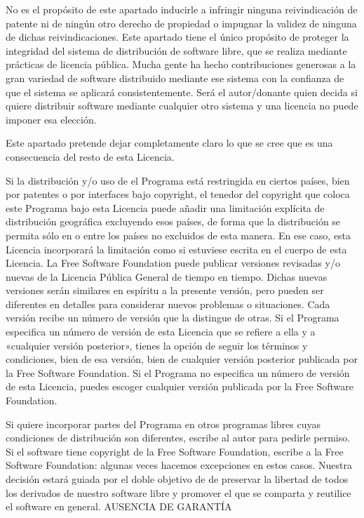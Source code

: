 No es el propósito de este apartado inducirle a infringir ninguna reivindicación de patente ni de ningún otro derecho de propiedad o impugnar la validez de ninguna de dichas reivindicaciones. Este apartado tiene el único propósito de proteger la integridad del sistema de distribución de software libre, que se realiza mediante prácticas de licencia pública. Mucha gente ha hecho contribuciones generosas a la gran variedad de software distribuido mediante ese sistema con la confianza de que el sistema se aplicará consistentemente. Será el autor/donante quien decida si quiere distribuir software mediante cualquier otro sistema y una licencia no puede imponer esa elección.

Este apartado pretende dejar completamente claro lo que se cree que es una consecuencia del resto de esta Licencia.

Si la distribución y/o uso de el Programa está restringida en ciertos países, bien por patentes o por interfaces bajo copyright, el tenedor del copyright que coloca este Programa bajo esta Licencia puede añadir una limitación explícita de distribución geográfica excluyendo esos países, de forma que la distribución se permita sólo en o entre los países no excluidos de esta manera. En ese caso, esta Licencia incorporará la limitación como si estuviese escrita en el cuerpo de esta Licencia.
La Free Software Foundation puede publicar versiones revisadas y/o nuevas de la Licencia Pública General de tiempo en tiempo. Dichas nuevas versiones serán similares en espíritu a la presente versión, pero pueden ser diferentes en detalles para considerar nuevos problemas o situaciones.
Cada versión recibe un número de versión que la distingue de otras. Si el Programa especifica un número de versión de esta Licencia que se refiere a ella y a «cualquier versión posterior», tienes la opción de seguir los términos y condiciones, bien de esa versión, bien de cualquier versión posterior publicada por la Free Software Foundation. Si el Programa no especifica un número de versión de esta Licencia, puedes escoger cualquier versión publicada por la Free Software Foundation.

Si quiere incorporar partes del Programa en otros programas libres cuyas condiciones de distribución son diferentes, escribe al autor para pedirle permiso. Si el software tiene copyright de la Free Software Foundation, escribe a la Free Software Foundation: algunas veces hacemos excepciones en estos casos. Nuestra decisión estará guiada por el doble objetivo de de preservar la libertad de todos los derivados de nuestro software libre y promover el que se comparta y reutilice el software en general.
AUSENCIA DE GARANTÍA

